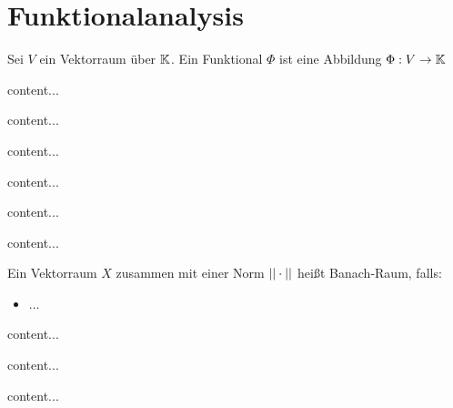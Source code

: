 \section{Funktionalanalysis}

\begin{definition}[Funktional]
	Sei $V$ ein Vektorraum über $\mathbb{K}$. Ein Funktional $\Phi$ ist eine Abbildung $\Phi : V \rightarrow \mathbb{K}$
\end{definition}

\begin{definition}
	content...
\end{definition}

\begin{definition}
	content...
\end{definition}

\begin{satz}
	content...
\end{satz}

\begin{definition}[Eigenfunktionen]
	content...
\end{definition}

\begin{definition}[Faltung]
	content...
\end{definition}

\begin{definition}
	content...
\end{definition}

\begin{definition}
	Ein Vektorraum $X$ zusammen mit einer Norm $||\cdot||$ heißt Banach-Raum, falls:
	\begin{itemize}
		\item ...
	\end{itemize}
\end{definition}


\begin{definition}
	content...
\end{definition}

\begin{definition}
	content...
\end{definition}

\begin{definition}
	content...
\end{definition}

\pagebreak


